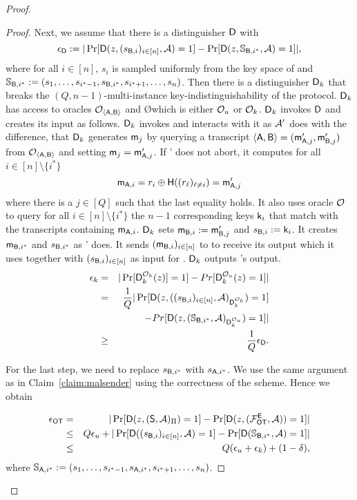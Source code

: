 \begin{proof}
\begin{proof}
Next, we assume that there is a distinguisher $\mathsf D$ with
$$
\epsilon_{\mathsf D}:=|\Pr[\mathsf D(z,(s_{\mathsf{B},i})_{i\in[n]},\mathcal{A})=1] -\Pr[\mathsf D(z,\mathsf{\mathbb S}_{\mathsf{B},i^*}, \mathcal{A})=1]|,
$$
where for all $i\in[n]$, $s_i$ is sampled uniformly from the key space of \UKA and $\mathsf{\mathbb S}_{\mathsf{B},i^*}:=(s_{1},\dots, s_{i^*-1},s_{\mathsf{B},i^*},s_{i^*+1},\dots, s_{n})$. Then there is a distinguisher $\mathsf D_k$ that breaks the $(Q,n-1)$-multi-instance key-indistinguishability of the \UKA protocol. $\mathsf D_k$ has access to oracles $\mathcal{O}_{\langle \mathsf{A},\mathsf{B}\rangle}$ and \O which is either $\mathcal{O}_u$ or $\mathcal{O}_k$. $\mathsf D_k$ invokes $\mathsf D$ and creates its input as follows. $\mathsf D_k$ invokes \Adv and interacts with it as $\mathcal{A}'$ does with the difference, that $\mathsf D_k$ generates $\mathsf{m}_j$ by querying a transcript $\langle \mathsf{A}, \mathsf{B}\rangle=(\mathsf{m}_{\mathsf{A},j}',\mathsf{m}_{\mathsf{B},j}')$ from $\mathcal{O}_{\langle \mathsf{A},\mathsf{B}\rangle}$ and setting $\mathsf{m}_j=\mathsf{m}_{\mathsf{A},j}'$. If \Adv' does not abort, it computes for all $i\in[n]\setminus\{i^*\}$
$$
\mathsf{m}_{\mathsf{A},i}=r_i\oplus\mathsf{H}((r_{\ell})_{\ell\neq i})=\mathsf{m}_{\mathsf{A},j}'
$$
where there is a $j\in[Q]$ such that the last equality holds. It also uses oracle $\mathcal{O}$ to query for all $i\in[n]\setminus\{i^*\}$ the $n-1$ corresponding keys $\mathsf{k}_i$ that match with the transcripts containing $\mathsf{m}_{\mathsf{A},i}$. $\mathsf D_k$ sets $\mathsf{m}_{\mathsf{B},i}:=\mathsf{m}_{\mathsf{B},j}'$ and $s_{\mathsf{B},i}:=\mathsf{k}_i$. It creates $\mathsf{m}_{\mathsf{B},i^*}$ and $s_{\mathsf{B},i^*}$ as \Adv' does. It sends $(\mathsf{m}_{\mathsf{B},i})_{i\in[n]}$ to \Adv to receive its output which it uses together with $(s_{\mathsf{B},i})_{i\in[n]}$ as input for \D. $\mathsf D_k$ outputs \D's output.  
\begin{eqnarray*}
\epsilon_{k}&=&|\Pr[\mathsf D_k^{\mathcal{O}_{k}}(z)]=1]-Pr[\mathsf D_k^{\mathcal{O}_{u}}(z)=1]|\\
&= &\frac{1}{Q}|\Pr[\mathsf D(z,((s_{\mathsf{B},i})_{i\in[n]},\mathcal{A})_{\mathsf D_k^{\mathcal{O}_{k}}})=1]\\
&&-Pr[\mathsf D(z,(\mathsf{\mathbb S}_{\mathsf{B},i^*},\mathcal{A})_{\mathsf D_k^{\mathcal{O}_{u}}})=1]|\\
&\geq&\frac{1}{Q}\epsilon_{\mathsf D}.
\end{eqnarray*}

For the last step, we need to replace $s_{\mathsf{B},i^*}$ with $s_{\mathsf{A},i^*}$. We use the same argument as in Claim~\ref{claim:malsender} using the correctness of the scheme. Hence we obtain

\begin{eqnarray*}
\epsilon_{\mathsf{OT}} &=&|\Pr[\mathsf D(z,(\mathsf{S}, \mathcal{A})_{\Pi})=1] -\Pr[\mathsf D(z,(\mathcal{F}_{\mathsf{OT}}^\mathsf{E},\mathcal{A}))=1]|\\
&\leq & Q\epsilon_{u}+|\Pr[\mathsf D((s_{\mathsf{B},i})_{i\in[n]},\mathcal{A})=1]-\Pr[\mathsf D(\mathsf{\mathbb S}_{\mathsf{B},i^*}, \mathcal{A})=1]|\\
&\leq &Q(\epsilon_{u}+\epsilon_{k})+(1-\delta),
\end{eqnarray*}
where $\mathsf{\mathbb S}_{\mathsf{A},i^*}:=(s_{1},\dots, s_{i^*-1},s_{\mathsf{A},i^*},s_{i^*+1},\dots, s_{n})$.
\pe
\end{proof}
\pe
\end{proof}


